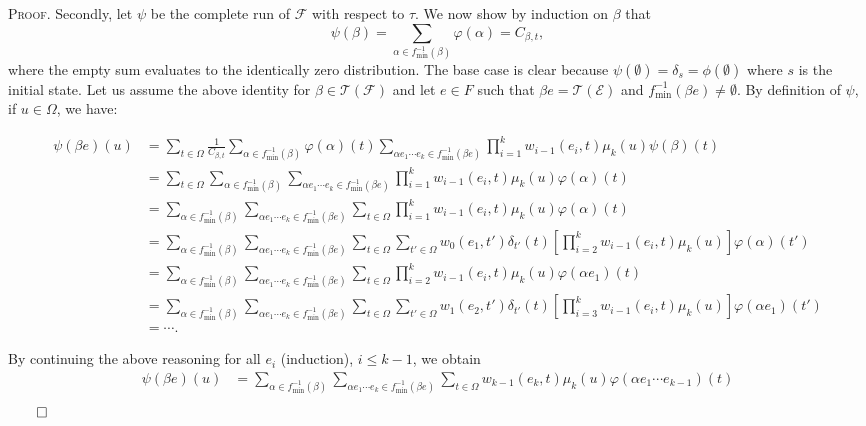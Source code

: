 \documentclass[review]{elsart}
\newenvironment{proof}{\par
\noindent
\textsc{Proof. }
\noindent}{\hfill\(\qed\)}
\newcommand{\EE}{\mathcal{E}}
\newcommand{\FF}{\mathcal{F}}
\newcommand{\TT}{\mathcal{T}}
\begin{document}
\begin{proof}
Secondly, let $\psi$ be the complete run of $\FF$ with respect to $\tau$. We now show by induction on $\beta$ that 
\begin{equation}\label{eq:subgoal}
\psi(\beta) = \sum_{\alpha{\in} f_{\min}^{-1}(\beta)}\varphi(\alpha) = C_{\beta,t},
\end{equation}
where the empty sum evaluates to the identically zero distribution. The base case is clear because $\psi(\emptyset) {=} \delta_{s} {=} \phi(\emptyset)$ where $s$ is the initial state. Let us assume the above identity for $\beta{\in}\TT(\FF)$ and let $e{\in} F$ such that $\beta e {=} \TT(\EE)$ and $f_{\min}^{-1}(\beta e){\neq}\emptyset$. By definition of $\psi$, if $u{\in}\Omega$, we have:
\begin{footnotesize}
\begin{align*}
\psi(\beta e)(u) &= \sum_{t{\in}\Omega} \frac{1}{C_{\beta,t}}\sum_{\alpha{\in} f_{\min}^{-1}(\beta)}\varphi(\alpha)(t)\sum_{\alpha e_1\cdots e_k{\in} f_{\min}^{-1}(\beta e)}\prod_{i=1}^{k}w_{i-1}(e_i,t)\mu_k(u)\psi(\beta)(t)\\
& = \sum_{t{\in}\Omega}\sum_{\alpha{\in} f_{\min}^{-1}(\beta)}\sum_{\alpha e_1\cdots e_k{\in} f_{\min}^{-1}(\beta e)}\prod_{i=1}^{k}w_{i-1}(e_i,t)\mu_k(u)\varphi(\alpha)(t) \\
& = \sum_{\alpha{\in} f_{\min}^{-1}(\beta)}\sum_{\alpha e_1\cdots e_k{\in} f_{\min}^{-1}(\beta e)}\sum_{t{\in} \Omega}\prod_{i=1}^{k}w_{i-1}(e_i,t)\mu_k(u)\varphi(\alpha)(t)\\
& =  \sum_{\alpha{\in} f_{\min}^{-1}(\beta)}\sum_{\alpha e_1\cdots e_k{\in} f_{\min}^{-1}(\beta e)}\sum_{t{\in} \Omega} \sum_{t'{\in}\Omega} w_0(e_1,t')\delta_{t'}(t)\left[\prod_{i=2}^{k}w_{i-1}(e_i,t)\mu_k(u)\right]\varphi(\alpha)(t')\\
& =\sum_{\alpha{\in} f_{\min}^{-1}(\beta)}\sum_{\alpha e_1\cdots e_k{\in} f_{\min}^{-1}(\beta e)}\sum_{t{\in} \Omega}\prod_{i=2}^{k}w_{i-1}(e_i,t)\mu_k(u)\varphi(\alpha e_1)(t)\\
& =  \sum_{\alpha{\in} f_{\min}^{-1}(\beta)}\sum_{\alpha e_1\cdots e_k{\in} f_{\min}^{-1}(\beta e)}\sum_{t{\in} \Omega} \sum_{t'{\in}\Omega} w_1(e_2,t')\delta_{t'}(t)\left[\prod_{i=3}^{k}w_{i-1}(e_i,t)\mu_k(u)\right]\varphi(\alpha e_1)(t')\\
& = \cdots .
\end{align*}
\end{footnotesize}
By continuing the above reasoning for all $e_i$ (induction), $i\leq k-1$, we obtain 
\begin{align*}
\psi(\beta e)(u) & = \sum_{\alpha{\in} f_{\min}^{-1}(\beta)}\sum_{\alpha e_1\cdots e_k{\in} f_{\min}^{-1}(\beta e)}\sum_{t{\in} \Omega}w_{k-1}(e_k,t)\mu_k(u)\varphi(\alpha e_1\cdots e_{k-1})(t)\nonumber\\

\end{align*}
\end{proof}
\end{document}
